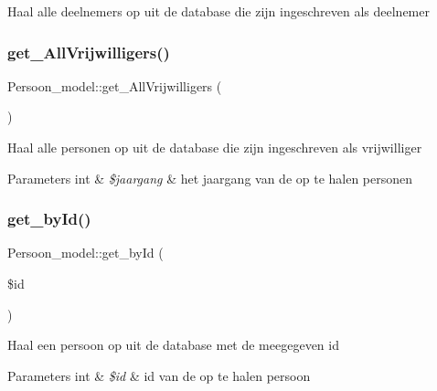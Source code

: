 Haal alle deelnemers op uit de database die zijn ingeschreven als deelnemer \mbox{\label{class_persoon__model_a3ec3c4838d03ea025746333367305dfc}} 
\subsubsection{\texorpdfstring{get\+\_\+\+All\+Vrijwilligers()}{get\_AllVrijwilligers()}}
{\footnotesize\ttfamily Persoon\+\_\+model\+::get\+\_\+\+All\+Vrijwilligers (\begin{DoxyParamCaption}{ }\end{DoxyParamCaption})}

Haal alle personen op uit de database die zijn ingeschreven als vrijwilliger 
\begin{DoxyParams}[1]{Parameters}
int & {\em \$jaargang} & het jaargang van de op te halen personen \\
\hline
\end{DoxyParams}
\mbox{\label{class_persoon__model_a0b88e4e63e880d5c6a5c18a12ac21272}} 
\subsubsection{\texorpdfstring{get\+\_\+by\+Id()}{get\_byId()}}
{\footnotesize\ttfamily Persoon\+\_\+model\+::get\+\_\+by\+Id (\begin{DoxyParamCaption}\item[{}]{\$id }\end{DoxyParamCaption})}

Haal een persoon op uit de database met de meegegeven id 
\begin{DoxyParams}[1]{Parameters}
int & {\em \$id} & id van de op te halen persoon \\
\hline
\end{DoxyParams}
\mbox{\label{class_persoon__model_af6238e2ada132ef41f5ab612f027c879}} 
